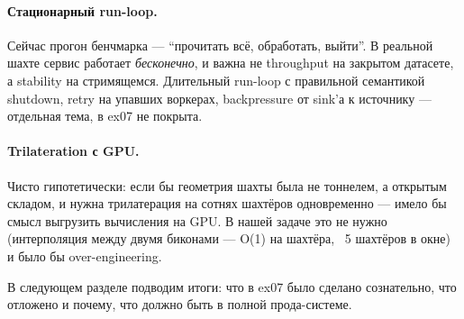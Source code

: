 \paragraph{Стационарный run-loop.} Сейчас прогон бенчмарка ---
``прочитать всё, обработать, выйти''. В реальной шахте сервис
работает \emph{бесконечно}, и важна не throughput на закрытом
датасете, а stability на стримящемся. Длительный run-loop с
правильной семантикой shutdown, retry на упавших воркерах,
backpressure от sink'а к источнику --- отдельная тема, в ex07 не
покрыта.

\paragraph{Trilateration с GPU.} Чисто гипотетически: если бы
геометрия шахты была не тоннелем, а открытым складом, и нужна
трилатерация на сотнях шахтёров одновременно --- имело бы смысл
выгрузить вычисления на GPU. В нашей задаче это не нужно
(интерполяция между двумя биконами --- O(1) на шахтёра, ~5
шахтёров в окне) и было бы over-engineering.

\medskip

В следующем разделе подводим итоги: что в ex07 было сделано
сознательно, что отложено и почему, что должно быть в полной
прода-системе.
